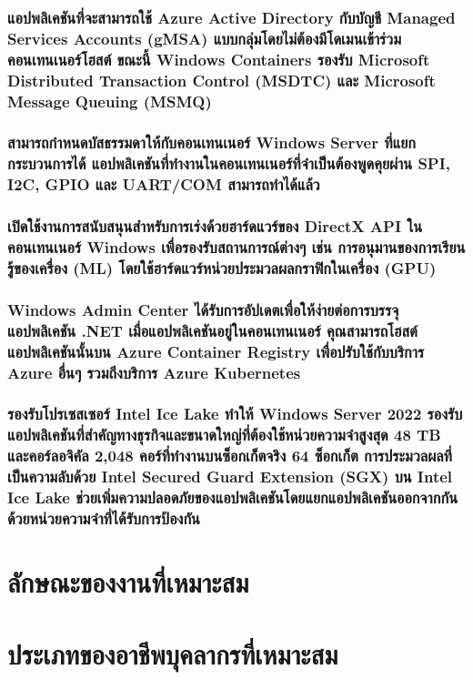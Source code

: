 \hspace{1cm}\subsubsection{แอปพลิเคชันที่จะสามารถใช้ Azure Active Directory กับบัญชี Managed Services Accounts (gMSA) แบบกลุ่มโดยไม่ต้องมีโดเมนเข้าร่วมคอนเทนเนอร์โฮสต์ ขณะนี้ Windows Containers รองรับ Microsoft Distributed Transaction Control (MSDTC) และ Microsoft Message Queuing (MSMQ)}

\hspace{1cm}\subsubsection{สามารถกำหนดบัสธรรมดาให้กับคอนเทนเนอร์ Windows Server ที่แยกกระบวนการได้ แอปพลิเคชันที่ทำงานในคอนเทนเนอร์ที่จำเป็นต้องพูดคุยผ่าน SPI, I2C, GPIO และ UART/COM สามารถทำได้แล้ว }

\hspace{1cm}\subsubsection{เปิดใช้งานการสนับสนุนสำหรับการเร่งด้วยฮาร์ดแวร์ของ DirectX API ในคอนเทนเนอร์ Windows เพื่อรองรับสถานการณ์ต่างๆ เช่น การอนุมานของการเรียนรู้ของเครื่อง (ML) โดยใช้ฮาร์ดแวร์หน่วยประมวลผลกราฟิกในเครื่อง (GPU) }

\hspace{1cm}\subsubsection{Windows Admin Center ได้รับการอัปเดตเพื่อให้ง่ายต่อการบรรจุแอปพลิเคชัน .NET เมื่อแอปพลิเคชันอยู่ในคอนเทนเนอร์ คุณสามารถโฮสต์แอปพลิเคชันนั้นบน Azure Container Registry เพื่อปรับใช้กับบริการ Azure อื่นๆ รวมถึงบริการ Azure Kubernetes }

\hspace{1cm}\subsubsection{รองรับโปรเซสเซอร์ Intel Ice Lake ทำให้ Windows Server 2022 รองรับแอปพลิเคชันที่สำคัญทางธุรกิจและขนาดใหญ่ที่ต้องใช้หน่วยความจำสูงสุด 48 TB และคอร์ลอจิคัล 2,048 คอร์ที่ทำงานบนซ็อกเก็ตจริง 64 ซ็อกเก็ต การประมวลผลที่เป็นความลับด้วย Intel Secured Guard Extension (SGX) บน Intel Ice Lake ช่วยเพิ่มความปลอดภัยของแอปพลิเคชันโดยแยกแอปพลิเคชันออกจากกันด้วยหน่วยความจำที่ได้รับการป้องกัน }

\clearpage



\section{ลักษณะของงานที่เหมาะสม}

\section{ประเภทของอาชีพบุคลากรที่เหมาะสม}
